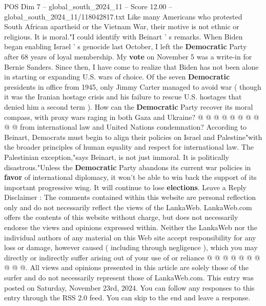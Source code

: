 \begin{textsample}{POS Dim 7 – global\_south\_2024\_11 – Score 12.00 – global\_south\_2024\_11/118042817.txt}
Like many Americans who protested South African apartheid or the Vietnam War, their motive is not ethnic or religious.
It is moral."I could identify with Beinart ' s remarks.
When Biden began enabling Israel ' s genocide last October, I left the \textbf{Democratic} Party after 68 years of loyal membership.
My \textbf{vote} on November 5 was a write-in for Bernie Sanders.
Since then, I have come to realize that Biden has not been alone in starting or expanding U.S. wars of choice.
Of the seven \textbf{Democratic} presidents in office from 1945, only Jimmy Carter managed to avoid war ( though it was the Iranian hostage crisis and his failure to rescue U.S. hostages that denied him a second term ).
How can the \textbf{Democratic} Party recover its moral compass, with proxy wars raging in both Gaza and Ukraine? @ @ @ @ @ @ @ @ @ @ from international law and United Nations condemnation?
According to Beinart, Democrats must begin to align their policies on Israel and Palestine"with the broader principles of human equality and respect for international law.
The Palestinian exception,"says Beinart, is not just immoral.
It is politically disastrous."Unless the \textbf{Democratic} Party abandons its current war policies in \textbf{favor} of international diplomacy, it won't be able to win back the support of its important progressive wing.
It will continue to lose \textbf{elections}.
Leave a Reply Disclaimer : The comments contained within this website are personal reflection only and do not necessarily reflect the views of the LankaWeb.
LankaWeb.com offers the contents of this website without charge, but does not necessarily endorse the views and opinions expressed within.
Neither the LankaWeb nor the individual authors of any material on this Web site accept responsibility for any loss or damage, however caused ( including through negligence ), which you may directly or indirectly suffer arising out of your use of or reliance @ @ @ @ @ @ @ @ @ @.
All views and opinions presented in this article are solely those of the surfer and do not necessarily represent those of LankaWeb.com.
This entry was posted on Saturday, November 23rd, 2024.
You can follow any responses to this entry through the RSS 2.0 feed.
You can skip to the end and leave a response.

\end{textsample}
